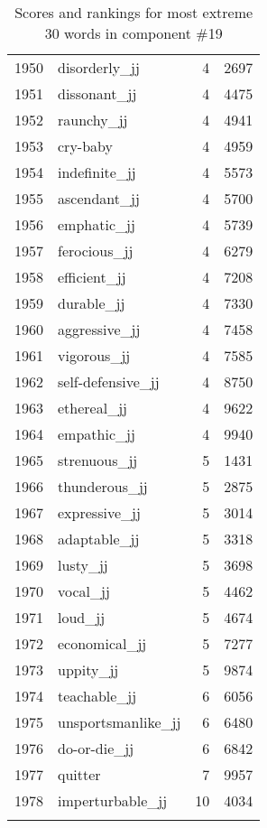 \begin{longtable}[!htbp]{| rlr@{.}l |}
    1950 & disorderly\_jj & 4 & 2697 \\
    1951 & dissonant\_jj & 4 & 4475 \\
    1952 & raunchy\_jj & 4 & 4941 \\
    1953 & cry-baby & 4 & 4959 \\
    1954 & indefinite\_jj & 4 & 5573 \\
    1955 & ascendant\_jj & 4 & 5700 \\
    1956 & emphatic\_jj & 4 & 5739 \\
    1957 & ferocious\_jj & 4 & 6279 \\
    1958 & efficient\_jj & 4 & 7208 \\
    1959 & durable\_jj & 4 & 7330 \\
    1960 & aggressive\_jj & 4 & 7458 \\
    1961 & vigorous\_jj & 4 & 7585 \\
    1962 & self-defensive\_jj & 4 & 8750 \\
    1963 & ethereal\_jj & 4 & 9622 \\
    1964 & empathic\_jj & 4 & 9940 \\
    1965 & strenuous\_jj & 5 & 1431 \\
    1966 & thunderous\_jj & 5 & 2875 \\
    1967 & expressive\_jj & 5 & 3014 \\
    1968 & adaptable\_jj & 5 & 3318 \\
    1969 & lusty\_jj & 5 & 3698 \\
    1970 & vocal\_jj & 5 & 4462 \\
    1971 & loud\_jj & 5 & 4674 \\
    1972 & economical\_jj & 5 & 7277 \\
    1973 & uppity\_jj & 5 & 9874 \\
    1974 & teachable\_jj & 6 & 6056 \\
    1975 & unsportsmanlike\_jj & 6 & 6480 \\
    1976 & do-or-die\_jj & 6 & 6842 \\
    1977 & quitter & 7 & 9957 \\
    1978 & imperturbable\_jj & 10 & 4034 \\
    \hline
    \caption{Scores and rankings for most extreme 30 words in component \#19} \\
\end{longtable}
